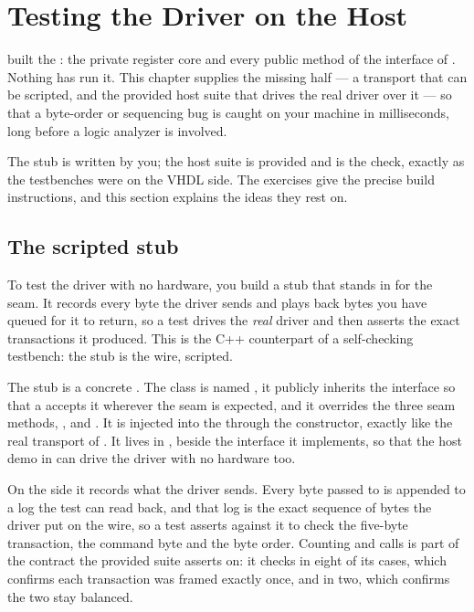 
\section{Testing the Driver on the Host}
\label{c8:sec:testing}\label{c8:app:a}
 built the : the private register core and every public method of the
interface of . Nothing has run it. This chapter supplies the missing half --- a transport
that can be scripted, and the provided host suite that drives the real driver over it --- so that a
byte-order or sequencing bug is caught on your machine in milliseconds, long before a logic analyzer
is involved.

The stub is written by you; the host suite is provided and is the check, exactly as the
 testbenches were on the VHDL side. The exercises give the precise build
instructions, and this section explains the ideas they rest on.

\subsection{The scripted stub}
\label{c8:sec:scripted_stub}
To test the driver with no hardware, you build a stub that stands in for the
 seam. It records every byte the driver sends and plays back bytes
you have queued for it to return, so a test drives the \emph{real} driver and then asserts the exact
transactions it produced. This is the C++ counterpart of a self-checking testbench: the stub is the
wire, scripted.

The stub is a concrete . The class is named
, it publicly inherits the interface so that a  accepts it
wherever the seam is expected, and it overrides the three seam methods, ,
 and . It is injected into the  through the constructor,
exactly like the real transport of . It lives in ,
beside the interface it implements, so that the host demo in  can drive the
driver with no hardware too.

On the  side it records what the driver sends. Every byte passed to  is
appended to a log the test can read back, and that log is the exact sequence of bytes the driver put
on the wire, so a test asserts against it to check the five-byte transaction, the command byte and
the byte order. Counting  and  calls is part of the contract the provided suite asserts
on: it checks  in eight of its cases, which confirms each transaction was framed
exactly once, and  in two, which confirms the two stay balanced.

